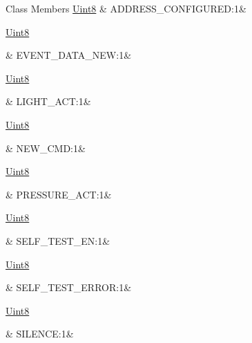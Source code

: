 \begin{DoxyFields}{Class Members}
\hypertarget{a00001_a35a37148d95085212fb25ac85a2151fe}{\hyperlink{a00001_a979e3e23b9a449e69ab6a8a83b6042f8}{Uint8}}\label{a00001_a35a37148d95085212fb25ac85a2151fe}
&
A\+D\+D\+R\+E\+S\+S\+\_\+\+C\+O\+N\+F\+I\+G\+U\+R\+E\+D\+:1&
\\
\hline

\hypertarget{a00001_a54229657d4761fb425b0059e82073a8e}{\hyperlink{a00001_a979e3e23b9a449e69ab6a8a83b6042f8}{Uint8}}\label{a00001_a54229657d4761fb425b0059e82073a8e}
&
E\+V\+E\+N\+T\+\_\+\+D\+A\+T\+A\+\_\+\+N\+E\+W\+:1&
\\
\hline

\hypertarget{a00001_a44ad333aeb6b48d6b28f18663306ef23}{\hyperlink{a00001_a979e3e23b9a449e69ab6a8a83b6042f8}{Uint8}}\label{a00001_a44ad333aeb6b48d6b28f18663306ef23}
&
L\+I\+G\+H\+T\+\_\+\+A\+C\+T\+:1&
\\
\hline

\hypertarget{a00001_aecc25efd522b7ecef912484c347a6cbd}{\hyperlink{a00001_a979e3e23b9a449e69ab6a8a83b6042f8}{Uint8}}\label{a00001_aecc25efd522b7ecef912484c347a6cbd}
&
N\+E\+W\+\_\+\+C\+M\+D\+:1&
\\
\hline

\hypertarget{a00001_a0a39453c9d31504a75c8dff625c763bd}{\hyperlink{a00001_a979e3e23b9a449e69ab6a8a83b6042f8}{Uint8}}\label{a00001_a0a39453c9d31504a75c8dff625c763bd}
&
P\+R\+E\+S\+S\+U\+R\+E\+\_\+\+A\+C\+T\+:1&
\\
\hline

\hypertarget{a00001_a172db6a18388cef4df3e0dc9f809de12}{\hyperlink{a00001_a979e3e23b9a449e69ab6a8a83b6042f8}{Uint8}}\label{a00001_a172db6a18388cef4df3e0dc9f809de12}
&
S\+E\+L\+F\+\_\+\+T\+E\+S\+T\+\_\+\+E\+N\+:1&
\\
\hline

\hypertarget{a00001_ac5426014cc438c905d41fb691d38815c}{\hyperlink{a00001_a979e3e23b9a449e69ab6a8a83b6042f8}{Uint8}}\label{a00001_ac5426014cc438c905d41fb691d38815c}
&
S\+E\+L\+F\+\_\+\+T\+E\+S\+T\+\_\+\+E\+R\+R\+O\+R\+:1&
\\
\hline

\hypertarget{a00001_a3a9f8543f815710c4935ff9205c3e25e}{\hyperlink{a00001_a979e3e23b9a449e69ab6a8a83b6042f8}{Uint8}}\label{a00001_a3a9f8543f815710c4935ff9205c3e25e}
&
S\+I\+L\+E\+N\+C\+E\+:1&
\\
\hline

\end{DoxyFields}
\label{d2/db1/a00070}
\hypertarget{a00001_d2/db1/a00070}{}
